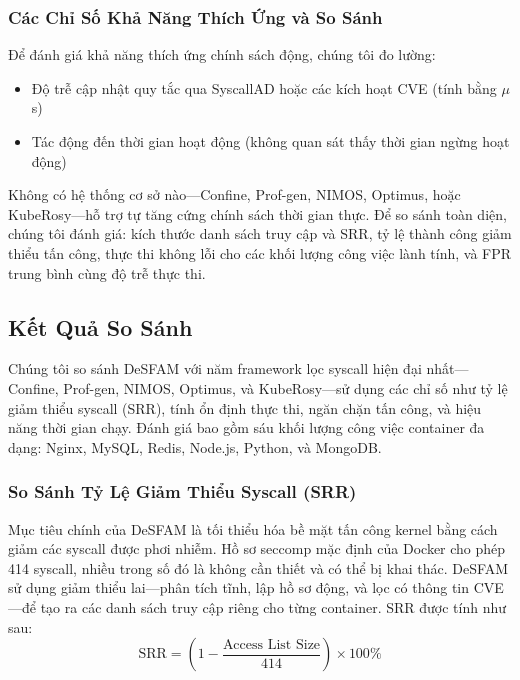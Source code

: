 \subsubsection{Các Chỉ Số Khả Năng Thích Ứng và So Sánh}
Để đánh giá khả năng thích ứng chính sách động, chúng tôi đo lường:
\begin{itemize}
  \item Độ trễ cập nhật quy tắc qua SyscallAD hoặc các kích hoạt CVE (tính bằng $\mu$s)
  \item Tác động đến thời gian hoạt động (không quan sát thấy thời gian ngừng hoạt động)
\end{itemize}
Không có hệ thống cơ sở nào---Confine, Prof-gen, NIMOS, Optimus, hoặc KubeRosy---hỗ trợ
tự tăng cứng chính sách thời gian thực. Để so sánh toàn diện, chúng tôi đánh giá: kích thước
danh sách truy cập và SRR, tỷ lệ thành công giảm thiểu tấn công, thực thi không lỗi cho các
khối lượng công việc lành tính, và FPR trung bình cùng độ trễ thực thi.

\subsection{Kết Quả So Sánh}
\label{subsec:comparative_results}

Chúng tôi so sánh DeSFAM với năm framework lọc syscall hiện đại nhất---Confine,
Prof-gen, NIMOS, Optimus, và KubeRosy---sử dụng các chỉ số như tỷ lệ giảm thiểu syscall (SRR),
tính ổn định thực thi, ngăn chặn tấn công, và hiệu năng thời gian chạy. Đánh giá bao gồm sáu
khối lượng công việc container đa dạng: Nginx, MySQL, Redis, Node.js, Python, và MongoDB.

\subsubsection{So Sánh Tỷ Lệ Giảm Thiểu Syscall (SRR)}

Mục tiêu chính của DeSFAM là tối thiểu hóa bề mặt tấn công kernel bằng cách giảm các syscall
được phơi nhiễm. Hồ sơ seccomp mặc định của Docker cho phép 414 syscall, nhiều trong số đó là
không cần thiết và có thể bị khai thác. DeSFAM sử dụng giảm thiểu lai---phân tích tĩnh, lập
hồ sơ động, và lọc có thông tin CVE---để tạo ra các danh sách truy cập riêng cho từng container.
SRR được tính như sau:
\begin{equation}
  \text{SRR} = \left(1 - \frac{\text{Access List Size}}{414}\right) \times 100\%
  \label{eq:srr_comparative}
\end{equation}


